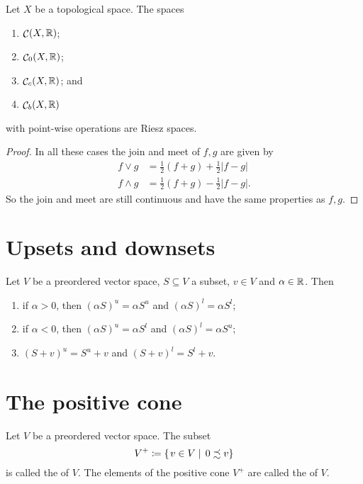 \begin{lemma}
Let $X$ be a topological space. The spaces
\begin{enumerate}
\item $\mathop{\mathcal{C}}(X,\mathbb{R})$;
\item $\mathop{\mathcal{C}}_0(X,\mathbb{R})$;
\item $\mathop{\mathcal{C}}_c(X,\mathbb{R})$; and
\item $\mathop{\mathcal{C}}_b(X,\mathbb{R})$
\end{enumerate}
with point-wise operations are Riesz spaces.
\end{lemma}
\begin{proof}
In all these cases the join and meet of $f,g$ are given by
\begin{align*}
f \vee g &= \frac{1}{2}(f+g)+ \frac{1}{2}|f-g| \\
f \wedge g &= \frac{1}{2}(f+g) - \frac{1}{2}|f-g|.
\end{align*}
So the join and meet are still continuous and have the same properties as $f,g$.
\end{proof}

\section{Upsets and downsets}
\begin{lemma} \label{lemma:sumMultipleUpDownsets}
Let $V$ be a preordered vector space, $S\subseteq V$ a subset, $v\in V$ and $\alpha\in \mathbb{R}$. Then
\begin{enumerate}
\item if $\alpha > 0$, then $(\alpha S)^u = \alpha S^u$ and $(\alpha S)^l = \alpha S^l$;
\item if $\alpha < 0$, then $(\alpha S)^u = \alpha S^l$ and $(\alpha S)^l = \alpha S^u$;
\item $(S+v)^u = S^u + v$ and $(S+v)^l = S^l + v$.
\end{enumerate}
\end{lemma}

\section{The positive cone}
\begin{definition}
Let $V$ be a preordered vector space. The subset
\[ V^+ \coloneqq \left\{\left. v\in V \;\right|\; 0 \precsim v \right\} \]
is called the  of $V$. The elements of the positive cone $V^+$ are called the  of $V$.
\end{definition}

